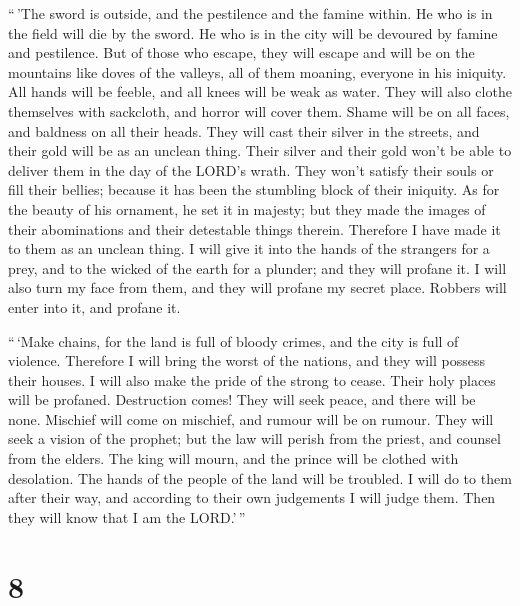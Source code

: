  ``\,'The sword is outside, and the pestilence and the
famine within. He who is in the field will die by the sword. He who is
in the city will be devoured by famine and pestilence. 
But of those who escape, they will escape and will be on the mountains
like doves of the valleys, all of them moaning, everyone in his
iniquity.  All hands will be feeble, and all knees will
be weak as water.  They will also clothe themselves with
sackcloth, and horror will cover them. Shame will be on all faces, and
baldness on all their heads.  They will cast their silver
in the streets, and their gold will be as an unclean thing. Their silver
and their gold won't be able to deliver them in the day of the LORD's
wrath. They won't satisfy their souls or fill their bellies; because it
has been the stumbling block of their iniquity.  As for
the beauty of his ornament, he set it in majesty; but they made the
images of their abominations and their detestable things therein.
Therefore I have made it to them as an unclean thing.  I
will give it into the hands of the strangers for a prey, and to the
wicked of the earth for a plunder; and they will profane it.
 I will also turn my face from them, and they will
profane my secret place. Robbers will enter into it, and profane it.

 ``\,`Make chains, for the land is full of bloody crimes,
and the city is full of violence.  Therefore I will bring
the worst of the nations, and they will possess their houses. I will
also make the pride of the strong to cease. Their holy places will be
profaned.  Destruction comes! They will seek peace, and
there will be none.  Mischief will come on mischief, and
rumour will be on rumour. They will seek a vision of the prophet; but
the law will perish from the priest, and counsel from the elders.
 The king will mourn, and the prince will be clothed with
desolation. The hands of the people of the land will be troubled. I will
do to them after their way, and according to their own judgements I will
judge them. Then they will know that I am the LORD.'\,''

\hypertarget{section-6}{%
\section{8}\label{section-6}}

